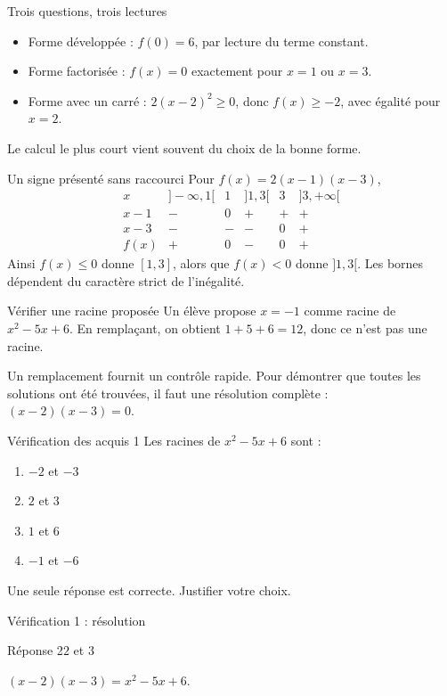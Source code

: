 \documentclass[aspectratio=169,12pt]{beamer}
\begin{document}
\renewcommand{\slidekind}{COMPRENDRE}
\begin{frame}[t,fragile]{Trois questions, trois lectures}
\begin{itemize}\item Forme développée : $f(0)=6$, par lecture du terme constant.\item Forme factorisée : $f(x)=0$ exactement pour $x=1$ ou $x=3$.\item Forme avec un carré : $2(x-2)^2\ge0$, donc $f(x)\ge-2$, avec égalité pour $x=2$.\end{itemize} Le calcul le plus court vient souvent du choix de la bonne forme.
\end{frame}
\renewcommand{\slidekind}{COMPRENDRE}
\begin{frame}[t,fragile]{Un signe présenté sans raccourci}
Pour $f(x)=2(x-1)(x-3)$,\[\begin{array}{c|ccccc}x&]-\infty,1[&1&]1,3[&3&]3,+\infty[\\\hline x-1&-&0&+&+&+\\x-3&-&-&-&0&+\\f(x)&+&0&-&0&+\end{array}\]\medskip Ainsi $f(x)\le0$ donne $[1,3]$, alors que $f(x)<0$ donne $]1,3[$. Les bornes dépendent du caractère strict de l’inégalité.
\end{frame}
\renewcommand{\slidekind}{À RETENIR}
\begin{frame}[t,fragile]{Vérifier une racine proposée}
Un élève propose $x=-1$ comme racine de $x^2-5x+6$. En remplaçant, on obtient $1+5+6=12$, donc ce n’est pas une racine.\medskip\par Un remplacement fournit un contrôle rapide. Pour démontrer que toutes les solutions ont été trouvées, il faut une résolution complète : $(x-2)(x-3)=0$.
\end{frame}
\renewcommand{\slidekind}{À VOUS DE JOUER}\begin{frame}[t]{Vérification des acquis 1}
Les racines de $x^2-5x+6$ sont :\begin{enumerate}
\item $-2$ et $-3$
\item $2$ et $3$
\item $1$ et $6$
\item $-1$ et $-6$
\end{enumerate}\medskip Une seule réponse est correcte. Justifier votre choix.\end{frame}
\renewcommand{\slidekind}{COMPRENDRE LA RÉPONSE}\begin{frame}[t]{Vérification 1 : résolution}
\begin{block}{Réponse 2}$2$ et $3$\end{block}\medskip $(x-2)(x-3)=x^2-5x+6$.\end{frame}
\end{document}
